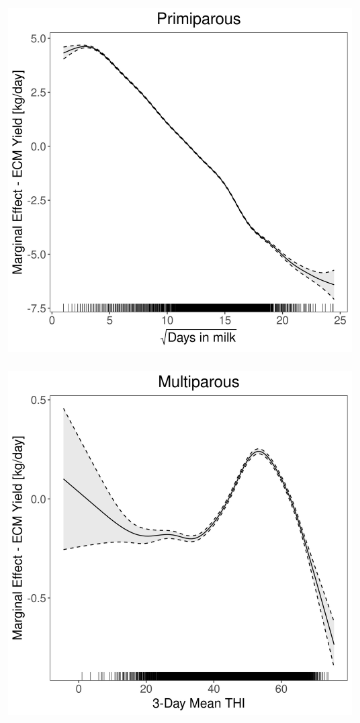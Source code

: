 \begin{figure}[H]
\begin{subfigure}[b]{0.45\textwidth}
    \end{subfigure}
    \hspace{0.05\textwidth} %
    \begin{subfigure}[b]{0.45\textwidth}
        \centering
        \includegraphics[width=\textwidth]{thesis/figures/models/ecm/before2010/si_ecm_before2010/si_ecm_before2010_marginal_dim_milk_primi.png}
    \end{subfigure}
    \begin{subfigure}[b]{0.45\textwidth}
        \centering
        \includegraphics[width=\textwidth]{thesis/figures/models/ecm/before2010/si_ecm_before2010/si_ecm_before2010_marginal_thi_milk_multi.png}

\end{subfigure}
\end{figure}
